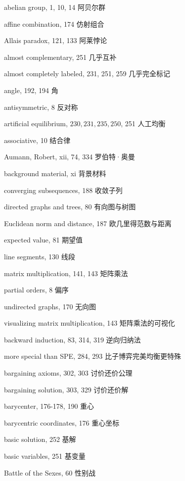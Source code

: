 \thispagestyle{empty}
\vspace*{2.2cm}

abelian group, 1, 10, 14  阿贝尔群

affine combination, 174  仿射组合

Allais paradox, 121, 133  阿莱悖论 

almost complementary, 251  几乎互补

almost completely labeled, 231, 251, 259  几乎完全标记 

angle, 192, 194  角

antisymmetric, 8  反对称

artificial equilibrium, $230,231,235,250$, 251  {\color{blue} 人工均衡}

associative, 10  结合律

Aumann, Robert, xii, 74, 334   罗伯特·奥曼 

background material, xi  背景材料

\quad converging subsequences, 188  收敛子列

\quad directed graphs and trees, 80  有向图与树图

\quad Euclidean norm and distance, 187  欧几里得范数与距离

\quad expected value, 81  期望值

\quad line segments, 130  线段

\quad matrix multiplication, 141, 143  矩阵乘法

\quad partial orders, 8  偏序 

\quad undirected graphs, 170  无向图

\quad visualizing matrix multiplication, 143  矩阵乘法的可视化 

backward induction, 83, 314, 319  逆向归纳法

\quad more special than SPE, 284, 293 比子博弈完美均衡更特殊

bargaining axioms, 302, 303 讨价还价公理

bargaining solution, 303, 329 讨价还价解

barycenter, 176-178, 190  重心

barycentric coordinates, 176 重心坐标

basic solution, 252  基解

basic variables, 251  基变量

Battle of the Sexes, 60  性别战


